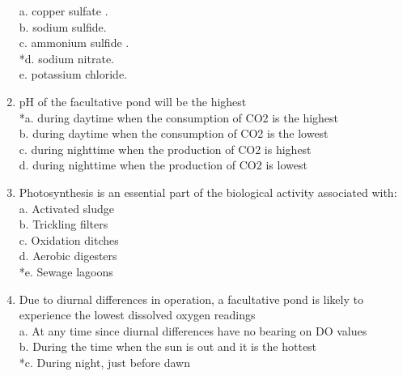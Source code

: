 \begin{enumerate}
a. copper sulfate . \\

b. sodium sulfide. \\

c. ammonium sulfide . \\

*d. sodium nitrate. \\

e. potassium chloride. \\


\item  pH of the facultative pond will be the highest \\


*a. during daytime when the consumption of CO2 is the highest \\

b. during daytime when the consumption of CO2 is the lowest \\

c. during nighttime when the production of CO2 is highest \\

d. during nighttime when the production of CO2 is lowest \\


\item  Photosynthesis is an essential part of the biological activity associated with: \\


a. Activated sludge \\

b. Trickling filters \\

c. Oxidation ditches \\

d. Aerobic digesters \\

*e. Sewage lagoons \\


\item  Due to diurnal differences in operation, a facultative pond is likely to experience the lowest dissolved oxygen readings \\


a. At any time since diurnal differences have no bearing on DO values \\

b. During the time when the sun is out and it is the hottest \\

*c. During night, just before dawn \\


\end{enumerate}
